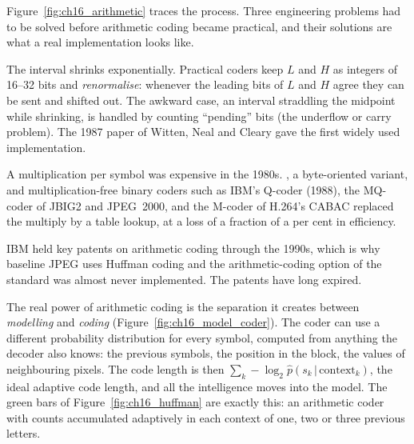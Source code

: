 Figure~\ref{fig:ch16_arithmetic} traces the process. Three engineering problems had to be solved
before arithmetic coding became practical, and their solutions are what a real implementation
looks like.
\begin{description}[style=nextline,leftmargin=1.2em,font=\sffamily\bfseries\small\color{navy}]
\item[Finite precision.] The interval shrinks exponentially. Practical coders keep $L$ and $H$ as
integers of 16--32 bits and \emph{renormalise}: whenever the leading bits of $L$ and $H$ agree they
can be sent and shifted out. The awkward case, an interval straddling the midpoint while shrinking,
is handled by counting ``pending'' bits (the underflow or carry problem). The 1987 paper of
Witten, Neal and Cleary gave the first widely used implementation.
\item[Speed.] A multiplication per symbol was expensive in the 1980s. , a
byte-oriented variant, and multiplication-free binary coders such as IBM's Q-coder (1988), the
MQ-coder of JBIG2 and JPEG~2000, and the M-coder of H.264's CABAC replaced the multiply by a table
lookup, at a loss of a fraction of a per cent in efficiency.
\item[Patents.] IBM held key patents on arithmetic coding through the 1990s, which is why baseline
JPEG uses Huffman coding and the arithmetic-coding option of the standard was almost never
implemented. The patents have long expired.
\end{description}

The real power of arithmetic coding is the separation it creates between \emph{modelling} and
\emph{coding} (Figure~\ref{fig:ch16_model_coder}). The coder can use a different probability distribution for every symbol, computed
from anything the decoder also knows: the previous symbols, the position in the block, the values
of neighbouring pixels. The code length is then $\sum_k-\log_2\hat p(s_k\,|\,\text{context}_k)$,
the ideal adaptive code length, and all the intelligence moves into the model. The green bars of
Figure~\ref{fig:ch16_huffman} are exactly this: an arithmetic coder with counts accumulated
adaptively in each context of one, two or three previous letters.



